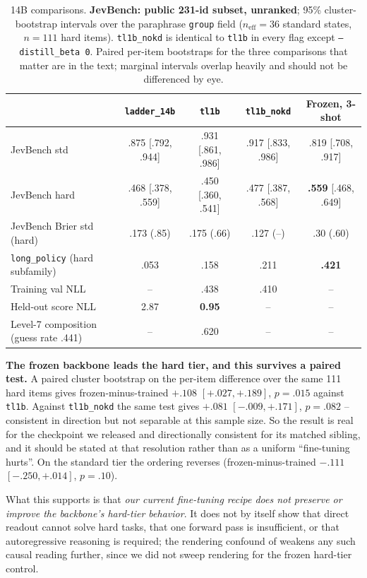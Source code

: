 \begin{table}[t]
  \centering
  \caption{14B comparisons. \textbf{JevBench: public 231-id subset, unranked}; 95\% cluster-bootstrap
  intervals over the paraphrase \texttt{group} field ($n_{\mathrm{eff}}{=}36$ standard states,
  $n{=}111$ hard items). \texttt{tl1b\_nokd} is identical to \texttt{tl1b} in every flag except
  \texttt{--distill\_beta 0}. Paired per-item bootstraps for the three comparisons that matter are in
  the text; marginal intervals overlap heavily and should not be differenced by eye.}
  \label{tab:tl1b}
  \small
  \setlength{\tabcolsep}{3pt}
  \begin{tabular}{lcccc}
    \toprule
    & \texttt{ladder\_14b} & \texttt{tl1b} & \texttt{tl1b\_nokd} & Frozen, 3-shot \\
    \midrule
    JevBench std & .875 [.792, .944] & .931 [.861, .986] & .917 [.833, .986] & .819 [.708, .917] \\
    JevBench hard & .468 [.378, .559] & .450 [.360, .541] & .477 [.387, .568] & \textbf{.559} [.468, .649] \\
    JevBench Brier std (hard) & .173 (.85) & .175 (.66) & .127 (--) & .30 (.60) \\
    \texttt{long\_policy} (hard subfamily) & .053 & .158 & .211 & \textbf{.421} \\
    Training val NLL & -- & .438 & .410 & -- \\
    Held-out score NLL & 2.87 & \textbf{0.95} & -- & -- \\
    Level-7 composition (guess rate .441) & -- & .620 & -- & -- \\
    \bottomrule
  \end{tabular}
\end{table}

\textbf{The frozen backbone leads the hard tier, and this survives a paired test.} A paired cluster
bootstrap on the per-item difference over the same 111 hard items gives frozen-minus-trained
$+.108$ $[+.027, +.189]$, $p{=}.015$ against \texttt{tl1b}. Against \texttt{tl1b\_nokd} the same test
gives $+.081$ $[-.009, +.171]$, $p{=}.082$ -- consistent in direction but not separable at this sample
size. So the result is real for the checkpoint we released and directionally consistent for its
matched sibling, and it should be stated at that resolution rather than as a uniform ``fine-tuning
hurts''. On the standard tier the ordering reverses (frozen-minus-trained $-.111$ $[-.250, +.014]$,
$p{=}.10$).

What this supports is that \emph{our current fine-tuning recipe does not preserve or improve the
backbone's hard-tier behavior}. It does not by itself show that direct readout cannot solve hard tasks,
that one forward pass is insufficient, or that autoregressive reasoning is required; the rendering
confound of  weakens any such causal reading further, since we did not
sweep rendering for the frozen hard-tier control.

